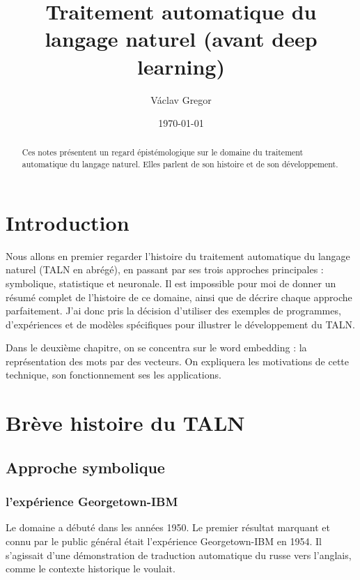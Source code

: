 \documentclass[11pt, a4paper]{report}
\title{Traitement automatique du langage naturel \newline
(avant deep learning)}
\author{Václav Gregor}
\date{\today}
\begin{document}
\maketitle

\tableofcontents


\begin{abstract}
  Ces notes présentent un regard épistémologique sur le domaine du traitement automatique du 
  langage naturel. Elles parlent de son histoire et de son développement.
\end{abstract}


\chapter{Introduction}
  Nous allons en premier regarder l'histoire du traitement automatique du langage 
  naturel (TALN en abrégé), en passant par ses 
  trois approches principales : symbolique, statistique et neuronale. 
  Il est impossible pour moi de donner un résumé complet de l'histoire de ce domaine, 
  ainsi que de décrire chaque approche parfaitement. J'ai donc pris la décision 
  d'utiliser des exemples de programmes, d'expériences et de modèles spécifiques 
  pour illustrer le développement du TALN. 
  
  Dans le deuxième chapitre, on se concentra sur le word embedding : la représentation 
  des mots par des vecteurs. On expliquera les motivations de cette technique, son fonctionnement ses les 
  applications. 
\chapter{Brève histoire du TALN}
  \section{Approche symbolique}
    \subsection{l'expérience Georgetown-IBM}
    \cite{wikipedia-nlp}
    \cite{wikipedia-georgetown} 
    \cite{hutchins-georgetown}
Le domaine a débuté dans les années 1950. Le premier résultat 
marquant et connu par le public général était l'expérience Georgetown-IBM en 1954. Il s'agissait d'une 
démonstration de traduction automatique du russe vers l'anglais, comme le 
contexte historique le voulait.
\end{document}
